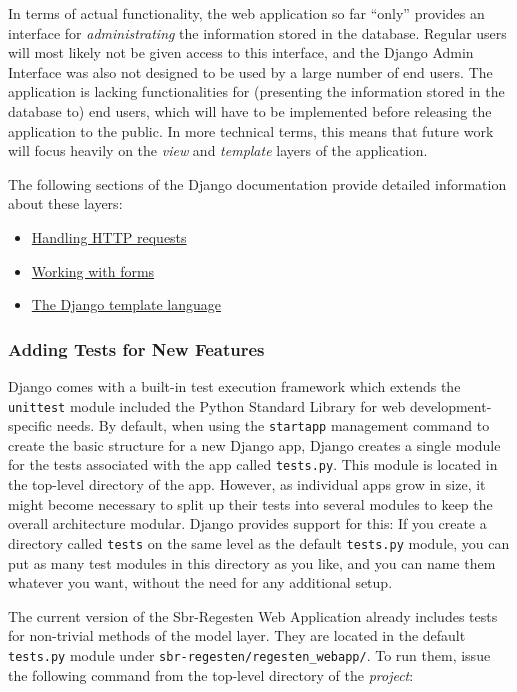 In terms of actual functionality, the web application so far ``only''
provides an interface for \emph{administrating} the information stored
in the database. Regular users will most likely not be given access to
this interface, and the Django Admin Interface was also not designed
to be used by a large number of end users. The application is lacking
functionalities for (presenting the information stored in the database
to) end users, which will have to be implemented before releasing the
application to the public. In more technical terms, this means that
future work will focus heavily on the \emph{view} and \emph{template}
layers of the application.

The following sections of the Django documentation provide detailed
information about these layers:

\begin{itemize}
\item
  \href{https://docs.djangoproject.com/en/1.4/topics/http/}{Handling
    HTTP requests}
\item
  \href{https://docs.djangoproject.com/en/1.4/topics/forms/}{Working
    with forms}
\item
  \href{https://docs.djangoproject.com/en/1.4/topics/templates/}{The
    Django template language}
\end{itemize}

\subsubsection{Adding Tests for New Features}
\label{sec:test}

Django comes with a built-in test execution framework which extends
the \texttt{unittest} module included the Python Standard Library for
web development-specific needs. By default, when using the
\texttt{startapp} management command to create the basic structure for
a new Django app, Django creates a single module for the tests
associated with the app called \texttt{tests.py}. This module is
located in the top-level directory of the app. However, as individual
apps grow in size, it might become necessary to split up their tests
into several modules to keep the overall architecture modular. Django
provides support for this: If you create a directory called
\texttt{tests} on the same level as the default \texttt{tests.py}
module, you can put as many test modules in this directory as you
like, and you can name them whatever you want, without the need for
any additional setup.

The current version of the Sbr-Regesten Web Application already
includes tests for non-trivial methods of the model layer. They are
located in the default \texttt{tests.py} module under
\texttt{sbr-regesten/regesten\_webapp/}. To run them, issue the
following command from the top-level directory of the \emph{project}:

